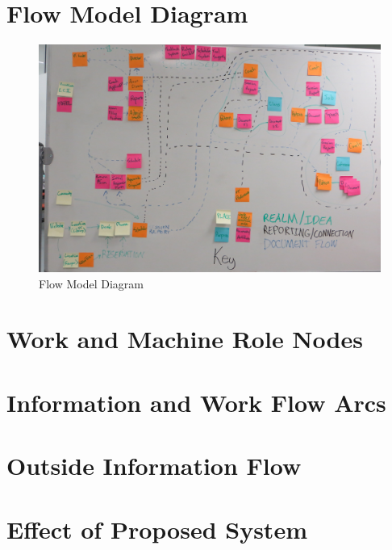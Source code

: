 \documentclass[12pt]{article} %
\begin{document}
\section{Flow Model Diagram}

\begin{figure}[H]
\centering
\includegraphics[width=0.95\linewidth]{flowChart}
\caption{Flow Model Diagram}
\label{fig:FlowChart}
\end{figure}

\section{Work and Machine Role Nodes}

\section{Information and Work Flow Arcs}

\section{Outside Information Flow}

\section{Effect of Proposed System}
\end{document}
